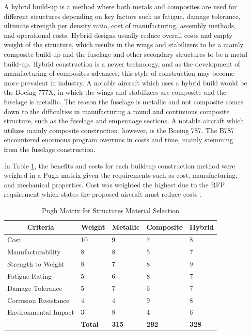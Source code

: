 A hybrid build-up is a method where both metals and composites are used for different structures depending on key factors such as fatigue, damage tolerance, ultimate strength per density ratio, cost of manufacturing, assembly methods, and operational costs. Hybrid designs usually reduce overall costs and empty weight of the structure, which results in the wings and stabilizers to be a mainly composite build-up and the fuselage and other secondary structures to be a metal build-up. Hybrid construction is a newer technology, and as the development of manufacturing of composites advances, this style of construction may become more prevalent in industry. A notable aircraft which uses a hybrid build would be the Boeing 777X, in which the wings and stabilizers are composite and the fuselage is metallic. The reason the fuselage is metallic and not composite comes down to the difficulties in manufacturing a round and continuous composite structure, such as the fuselage and empennage sections. A notable aircraft which utilizes mainly composite construction, however, is the Boeing 787. The B787 encountered enormous program overruns in costs and time, mainly stemming from the fuselage construction.

In Table \ref{tab:pugh_structures}, the benefits and costs for each build-up construction method were weighed in a Pugh matrix given the requirements such as cost, manufacturing, and mechanical properties. Cost was weighted the highest due to the RFP requirement which states the proposed aircraft must reduce costs \cite{RFP}.

\begin{table}[!h]
\centering
\caption{Pugh Matrix for Structures Material Selection}
\begin{tabular}{|p{3.5cm}||p{2cm}|p{2cm}|p{2cm}|p{2cm}| }
\toprule
\multicolumn{1}{|c||}{\textbf{Criteria}} & \multicolumn{1}{c|}{\textbf{Weight}} &  
\multicolumn{1}{c|}{\textbf{Metallic}} & \multicolumn{1}{c|}{\textbf{Composite}} & \multicolumn{1}{c|}{\textbf{Hybrid}} \\ \hline \hline 
Cost & 10 & 9 & 7 & 8 \\ \hline
Manufacturability & 8 & 8 & 5 & 7 \\  \hline
Strength to Weight & 8 & 7 & 8 & 9 \\  \hline
Fatigue Rating & 5 & 6 & 8 & 7 \\  \hline
Damage Tolerance & 5 & 7 & 6 & 7 \\  \hline
Corrosion Resistance & 4 & 4 & 9 & 8 \\  \hline
Environmental Impact & 3 & 8 & 4 & 6 \\  \hline \hline
 & \textbf{Total} & \textbf{315} & \textbf{292} & \textbf{328} \\
\bottomrule
\end{tabular}
\label{tab:pugh_structures}
\end{table}
\FloatBarrier

